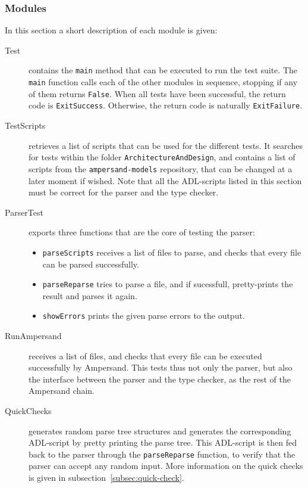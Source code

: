   \subsubsection{Modules}
  \label{subsec:test-modules}
  In this section a short description of each module is given:%
  \begin{description}
    \item[Test] contains the \texttt{main} method that can be executed to run the test suite.
      The \texttt{main} function calls each of the other modules in sequence, stopping if any of them returns \texttt{False}.
      When all tests have been successful, the return code is \texttt{ExitSuccess}.
      Otherwise, the return code is naturally \texttt{ExitFailure}.
    
    \item[TestScripts] retrieves a list of scripts that can be used for the different tests.
      It searches for tests within the folder \texttt{ArchitectureAndDesign}, and contains a list of scripts from the \texttt{ampersand-models} repository, that can be changed at a later moment if wished.
      Note that all the ADL-scripts listed in this section must be correct for the parser and the type checker.
    
    \item[ParserTest] exports three functions that are the core of testing the parser:
      \begin{itemize}
        \item \texttt{parseScripts} receives a list of files to parse, and checks that every file can be parsed successfully.
        \item \texttt{parseReparse} tries to parse a file, and if sucessfull, pretty-prints the result and parses it again.
        \item \texttt{showErrors} prints the given parse errors to the output.
      \end{itemize}
    
    \item[RunAmpersand] receives a list of files, and checks that every file can be executed successfully by Ampersand.
      This tests thus not only the parser, but also the interface between the parser and the type checker, as the rest of the Ampersand chain.
    
    \item[QuickChecks] generates random parse tree structures and generates the corresponding ADL-script by pretty printing the parse tree.
      This ADL-script is then fed back to the parser through the \texttt{parseReparse} function, to verify that the parser can accept any random input.
      More information on the quick checks is given in subsection~\ref{subsec:quick-check}.
    

\end{description}
